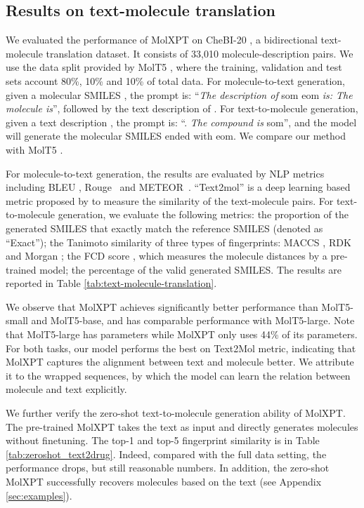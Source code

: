 \documentclass[11pt]{article}
\newcommand{\ourM}{MolXPT}
\newcommand{\som}{som}
\newcommand{\eom}{eom}
\begin{document}
\subsection{Results on text-molecule translation}
\label{sec:textmol_trans}
We evaluated the performance of \ourM{} on CheBI-20 \cite{text2mol}, a bidirectional text-molecule translation dataset. It consists of 33,010 molecule-description pairs. We use the data split provided by MolT5 \cite{molt5}, where the training, validation and test sets account 80\%, 10\% and 10\% of total data. For molecule-to-text generation, given a molecular SMILES , the prompt is: ``{\em The description of} \som{}  \eom{} {\em is: The molecule is}'', followed by the text description of . For  text-to-molecule generation, given a text description , the prompt is: ``. {\em The compound is} \som'', and the model will generate the molecular SMILES ended with \eom{}. We compare our method with MolT5 \cite{molt5}. 

For molecule-to-text generation, the results are evaluated by NLP metrics including BLEU \cite{bleu}, Rouge~\cite{rouge} and METEOR~\cite{meteor}. ``Text2mol'' is a deep learning based metric proposed by \citet{molt5} to measure the similarity of the text-molecule pairs. For text-to-molecule generation, we evaluate the following metrics: the proportion of the generated SMILES that exactly match the reference SMILES (denoted as ``Exact''); the Tanimoto similarity of three types of fingerprints: MACCS \cite{maccs}, RDK \cite{rdk} and Morgan \cite{morgan}; the FCD score \cite{fcd}, which measures the molecule distances by a pre-trained model; the percentage of the valid generated SMILES. The results are reported in Table \ref{tab:text-molecule-translation}. 

We observe that \ourM{} achieves significantly better performance than MolT5-small and MolT5-base, and has comparable performance with MolT5-large. Note that MolT5-large has  parameters while \ourM{} only uses 44\% of its parameters. For both tasks, our model performs the best on Text2Mol metric, indicating that \ourM{} captures the alignment between text and molecule better. We attribute it to the wrapped sequences, by which the model can learn the relation between molecule and text explicitly. 

We further verify the zero-shot text-to-molecule generation ability of \ourM{}. The pre-trained \ourM{} takes the text as input and directly generates molecules without finetuning. The top-1 and top-5 fingerprint similarity is in Table \ref{tab:zeroshot_text2drug}. Indeed, compared with the full data setting, the performance drops, but still  reasonable numbers. In addition, the zero-shot \ourM{} successfully recovers  molecules based on the text (see Appendix \ref{sec:examples}). 
\end{document}
